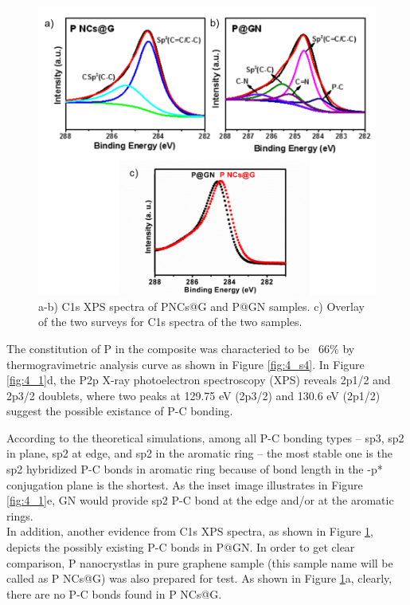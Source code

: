 \begin{figure}  
\centering
\includegraphics[width=\textwidth]{figures/figure4_s5}
\caption[C1s XPS spectra comparison]
{a-b) C1s XPS spectra of PNCs@G and P@GN samples. c) Overlay of the two surveys for C1s spectra of the two samples. 
\label{fig:4_s5}}
\end{figure}

The constitution of P in the composite was characteried to be ~66\% by thermogravimetric analysis curve as shown in Figure \ref{fig:4_s4}. In Figure \ref{fig:4_1}d, the P2p X-ray photoelectron spectroscopy (XPS) reveals 2p1/2 and 2p3/2 doublets, where two peaks at 129.75 eV (2p3/2) and 130.6 eV (2p1/2) suggest the possible existance of P-C bonding.\cite{Jiao2014b,Niu2014b,Zhang2013b} 

According to the theoretical simulations,\cite{Sun2014b,Claeyssens2009b} among all P-C bonding types -- sp3, sp2 in plane, sp2 at edge, and sp2 in the aromatic ring -- the most stable one is the sp2 hybridized P-C bonds in aromatic ring because of bond length in the \pi-p* conjugation plane is the shortest. As the inset image illustrates in Figure \ref{fig:4_1}e, GN would provide sp2 P-C bond at the edge and/or at the aromatic rings. \\

In addition, another evidence from C1s XPS spectra, as shown in Figure \ref{fig:4_s5}, depicts the possibly existing P-C bonds in P@GN. In order to get clear comparison, P nanocrystlas in pure graphene sample (this sample name will be called as P NCs@G) was also prepared for test. As shown in Figure \ref{fig:4_s5}a, clearly, there are no P-C bonds found in P NCs@G. 

